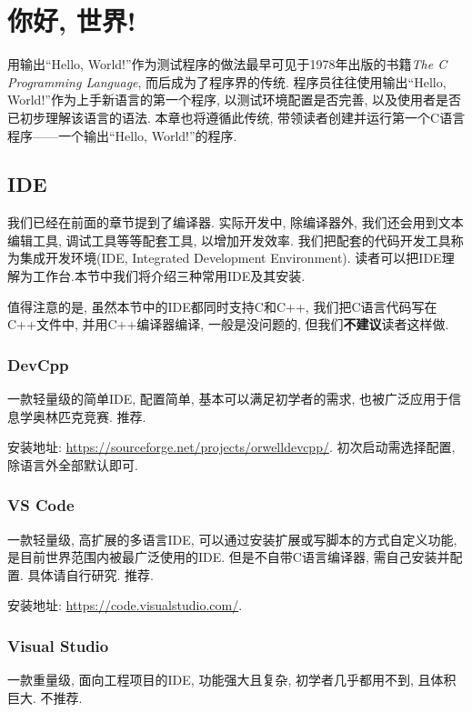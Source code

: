 \chapter{你好, 世界!} \label{你好, 世界!}
    用输出``Hello, World!''作为测试程序的做法最早可见于1978年出版的书籍\emph{The C Programming Language}, 而后成为了程序界的传统. 程序员往往使用输出``Hello, World!''作为上手新语言的第一个程序, 以测试环境配置是否完善, 以及使用者是否已初步理解该语言的语法. 本章也将遵循此传统, 带领读者创建并运行第一个C语言程序——一个输出``Hello, World!''的程序.

    \section{IDE}
        我们已经在前面的章节提到了编译器. 实际开发中, 除编译器外, 我们还会用到文本编辑工具, 调试工具等等配套工具, 以增加开发效率. 我们把配套的代码开发工具称为集成开发环境(IDE, Integrated Development Environment). 读者可以把IDE理解为工作台.本节中我们将介绍三种常用IDE及其安装. 
        
        值得注意的是, 虽然本节中的IDE都同时支持C和C++, 我们把C语言代码写在C++文件中, 并用C++编译器编译, 一般是没问题的, 但我们\textbf{不建议}读者这样做.
        
        \subsection*{DevCpp}
            一款轻量级的简单IDE, 配置简单, 基本可以满足初学者的需求, 也被广泛应用于信息学奥林匹克竞赛. 推荐.

            安装地址: \href{https://sourceforge.net/projects/orwelldevcpp/}{https://sourceforge.net/projects/orwelldevcpp/}. 初次启动需选择配置, 除语言外全部默认即可.

        \subsection*{VS Code}
            一款轻量级, 高扩展的多语言IDE, 可以通过安装扩展或写脚本的方式自定义功能, 是目前世界范围内被最广泛使用的IDE. 但是不自带C语言编译器, 需自己安装并配置. 具体请自行研究. 推荐.

            安装地址: \href{https://code.visualstudio.com/}{https://code.visualstudio.com/}.

        \subsection*{Visual Studio}
            一款重量级, 面向工程项目的IDE, 功能强大且复杂, 初学者几乎都用不到, 且体积巨大. 不推荐.

